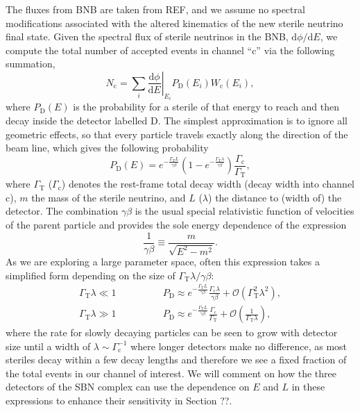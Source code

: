 \documentclass[11pt, a4paper]{article}
\begin{document}
The fluxes from BNB are taken from REF, and we assume no spectral modifications
associated with the altered kinematics of the new sterile neutrino final state.
%
Given the spectral flux of sterile neutrinos in the BNB,
$\mathrm{d}\phi/\mathrm{d}E$, we compute the total number of accepted events in
channel ``$\text{c}$'' via the following summation,
%
\[ N_\text{c} = \sum_{i} \left .
\frac{\mathrm{d}\phi}{\mathrm{d}E}\right|_{E_i} P_\text{D}\left(E_i\right)
W_\text{c}\left(E_i\right),  \]
%
where $P_\text{D}(E)$ is the probability for a sterile of that energy to reach
and then decay inside the detector labelled $\text{D}$. The simplest
approximation is to ignore all geometric effects, so that every particle
travels exactly along the direction of the beam line, which gives the following
probability 
%
\[ P_\text{D}\left(E\right) = e^{-\frac{\Gamma_\text{T}L}{\gamma\beta}}\left(
1-
e^{-\frac{\Gamma_\text{T}\lambda}{\gamma\beta}}\right)\frac{\Gamma_\text{c}}{\Gamma_\text{T}},
\label{eq:prob}
\]
%
where $\Gamma_\text{T}$ ($\Gamma_\text{c}$) denotes the rest-frame total decay
width (decay width into channel $\text{c}$), $m$ the mass of the sterile
neutrino, and $L$ ($\lambda$) the distance to (width of) the detector. The
combination $\gamma\beta$ is the usual special relativistic function of
velocities of the parent particle and provides the sole energy dependence of
the expression
%
\[   \frac{1}{\gamma\beta} \equiv \frac{m}{\sqrt{E^2-m^2}}. \]
%
As we are exploring a large parameter space, often this expression takes a
simplified form depending on the size of $\Gamma_\text{T}\lambda/\gamma\beta$:
%
\begin{align*} 
%
\Gamma_\text{T}\lambda \ll 1\qquad&\qquad P_\text{D} \approx
e^{-\frac{\Gamma_\text{T}L}{\gamma\beta}}\frac{\Gamma_\text{c}\lambda}{\gamma\beta}
+ \mathcal{O}\left(\Gamma_\text{T}^2\lambda^2\right),\\ 
%
\Gamma_\text{T}\lambda \gg 1\qquad&\qquad P_\text{D} \approx
e^{-\frac{\Gamma_\text{T}L}{\gamma\beta}}\frac{\Gamma_\text{c}}{\Gamma_\text{T}}
+ \mathcal{O}\left(\frac{1}{\Gamma_\text{T}\lambda}\right), 
%
\end{align*}
%
where the rate for slowly decaying particles can be seen to grow with detector
size until a width of $\lambda\sim\Gamma_\text{c}^{-1}$ where longer detectors
make no difference, as most steriles decay within a few decay lengths and
therefore we see a fixed fraction of the total events in our channel of interest. 
We will comment on how the three detectors of the SBN complex can use the 
dependence on $E$ and $L$ in these expressions to enhance their sensitivity in 
Section ??.
\end{document}
